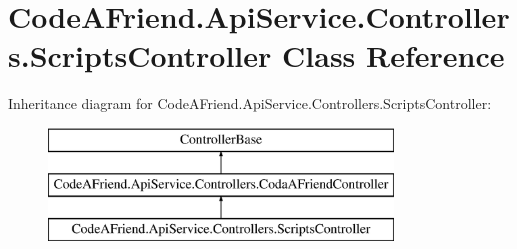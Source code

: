 \hypertarget{class_code_a_friend_1_1_api_service_1_1_controllers_1_1_scripts_controller}{}\section{Code\+A\+Friend.\+Api\+Service.\+Controllers.\+Scripts\+Controller Class Reference}
\label{class_code_a_friend_1_1_api_service_1_1_controllers_1_1_scripts_controller}


 


Inheritance diagram for Code\+A\+Friend.\+Api\+Service.\+Controllers.\+Scripts\+Controller\+:\begin{figure}[H]
\begin{center}
\leavevmode
\includegraphics[height=3.000000cm]{class_code_a_friend_1_1_api_service_1_1_controllers_1_1_scripts_controller}
\end{center}
\end{figure}
